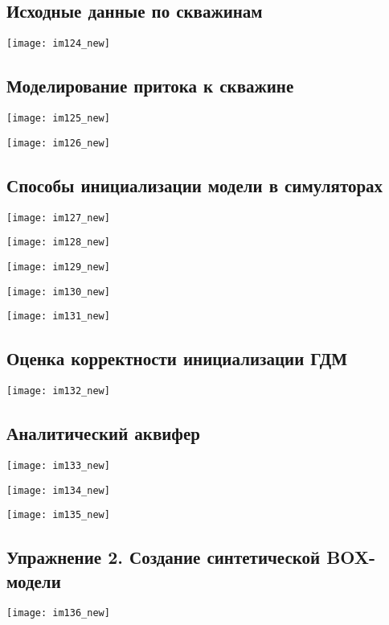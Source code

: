 \documentclass[main.tex]{subfiles}
\begin{document}
\subsection{Исходные данные по скважинам}

\texttt{[image: im124\_new]}

\subsection{Моделирование притока к скважине}

\texttt{[image: im125\_new]}

\texttt{[image: im126\_new]}

\subsection{Способы инициализации модели в симуляторах}

\texttt{[image: im127\_new]}

\texttt{[image: im128\_new]}

\texttt{[image: im129\_new]}

\texttt{[image: im130\_new]}

\texttt{[image: im131\_new]}

\subsection{Оценка корректности инициализации ГДМ}

\texttt{[image: im132\_new]}

\subsection{Аналитический аквифер}

\texttt{[image: im133\_new]}

\texttt{[image: im134\_new]}

\texttt{[image: im135\_new]}

\subsection{Упражнение 2. Создание синтетической BOX-модели}

\texttt{[image: im136\_new]}
\end{document}
